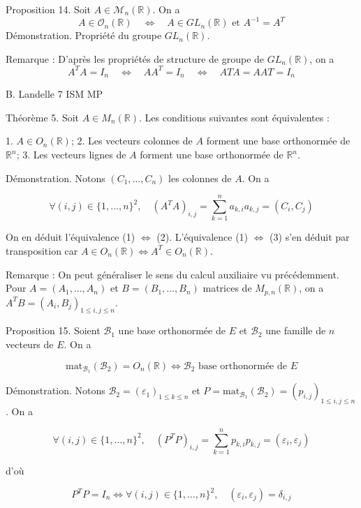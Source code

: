 Proposition 14. Soit $A \in \mathcal{M}_n(\mathbb{R})$. On a
\[
A \in \mathcal{O}_n(\mathbb{R}) \quad \Leftrightarrow \quad A \in GL_n(\mathbb{R}) \text{ et } A^{-1} = A^T
\]
Démonstration. Propriété du groupe $GL_n(\mathbb{R})$.

Remarque : D'après les propriétés de structure de groupe de $GL_n(\mathbb{R})$, on a
\[
A^T A = I_n \quad \Leftrightarrow \quad A A^T = I_n \quad \Leftrightarrow \quad A T A = A A T = I_n
\]

B. Landelle \hspace{1cm} 7 \hspace{3cm} ISM MP


Théorème 5. Soit $A \in M_n(\mathbb{R})$. Les conditions suivantes sont équivalentes :

1. $A \in O_n(\mathbb{R})$;
2. Les vecteurs colonnes de $A$ forment une base orthonormée de $\mathbb{R}^n$;
3. Les vecteurs lignes de $A$ forment une base orthonormée de $\mathbb{R}^n$.

Démonstration. Notons $(C_1, \dots, C_n)$ les colonnes de $A$. On a

\[ \forall (i,j) \in \{1, \dots, n\}^2, \quad (A^T A)_{i,j} = \sum_{k=1}^n a_{k,i} a_{k,j} = (C_i, C_j) \]

On en déduit l'équivalence (1) $\Leftrightarrow$ (2). L'équivalence (1) $\Leftrightarrow$ (3) s'en déduit par transposition car $A \in O_n(\mathbb{R}) \Leftrightarrow A^T \in O_n(\mathbb{R})$.

Remarque : On peut généraliser le sens du calcul auxiliaire vu précédemment. Pour $A = (A_1, \dots, A_n)$ et $B = (B_1, \dots, B_n)$ matrices de $M_{p,n}(\mathbb{R})$, on a $A^T B = (A_i, B_j)_{1 \leq i,j \leq n}$.

Proposition 15. Soient $\mathcal{B}_1$ une base orthonormée de $E$ et $\mathcal{B}_2$ une famille de $n$ vecteurs de $E$. On a

\[ \text{mat}_{\mathcal{B}_1}(\mathcal{B}_2) = O_n(\mathbb{R}) \Leftrightarrow \mathcal{B}_2 \text{ base orthonormée de } E \]

Démonstration. Notons $\mathcal{B}_2 = (\varepsilon_1)_{1 \leq k \leq n}$ et $P = \text{mat}_{\mathcal{B}_1}(\mathcal{B}_2) = (p_{i,j})_{1 \leq i,j \leq n}$. On a

\[ \forall (i,j) \in \{1, \dots, n\}^2, \quad (P^T P)_{i,j} = \sum_{k=1}^n p_{k,i} p_{k,j} = (\varepsilon_i, \varepsilon_j) \]

d'où

\[ P^T P = I_n \Leftrightarrow \forall (i,j) \in \{1, \dots, n\}^2, \quad (\varepsilon_i, \varepsilon_j) = \delta_{i,j} \]

